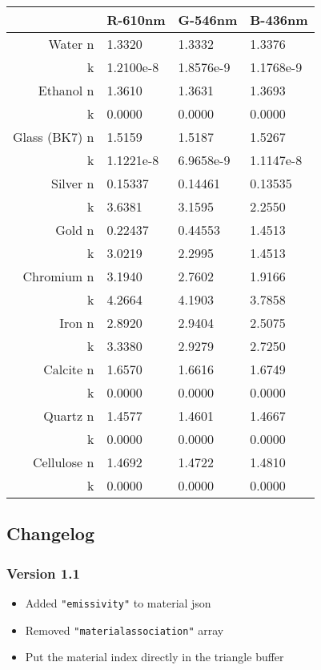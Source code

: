 \documentclass[english,10pt,a4paper,twocolumn,colorscheme=green]{orarticle}
\begin{document}
	\begin{tabular}{|r|l|l|l|}
		\hline
		& R-610nm & G-546nm & B-436nm\\
		\hline
		Water n & 1.3320 & 1.3332 & 1.3376\\
		k & 1.2100e-8 & 1.8576e-9 & 1.1768e-9\\
		\hline
		Ethanol n & 1.3610 & 1.3631 & 1.3693\\
		k & 0.0000 & 0.0000 & 0.0000\\
		\hline
		Glass (BK7) n & 1.5159 & 1.5187 & 1.5267\\
		k & 1.1221e-8 & 6.9658e-9 & 1.1147e-8\\
		\hline
		Silver n & 0.15337 & 0.14461 & 0.13535\\
		k & 3.6381 & 3.1595 & 2.2550\\
		\hline
		Gold n & 0.22437 & 0.44553 & 1.4513\\
		k & 3.0219 & 2.2995 & 1.4513\\
		\hline
		Chromium n & 3.1940 & 2.7602 & 1.9166\\
		k & 4.2664 & 4.1903 & 3.7858\\
		\hline
		Iron n & 2.8920 & 2.9404 & 2.5075\\
		k & 3.3380 & 2.9279 & 2.7250\\
		\hline
		Calcite n & 1.6570 & 1.6616 & 1.6749\\
		k & 0.0000 & 0.0000 & 0.0000\\
		\hline
		Quartz n & 1.4577 & 1.4601 & 1.4667\\
		k & 0.0000 & 0.0000 & 0.0000\\
		\hline
		Cellulose n & 1.4692 & 1.4722 & 1.4810\\
		k & 0.0000 & 0.0000 & 0.0000\\
		\hline
	\end{tabular}
	
	\subsection{Changelog}
	\subsubsection{Version 1.1}
	\begin{itemize}
		\item Added \lstinline|"emissivity"| to material json
		\item Removed \lstinline|"materialassociation"| array
		\item Put the material index directly in the triangle buffer
	\end{itemize}
\end{document}
